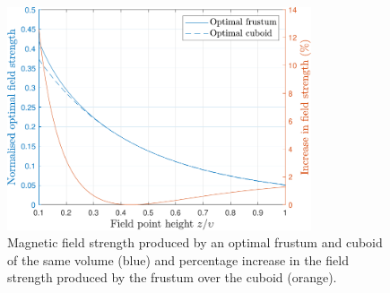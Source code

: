 \begin{figure}
	\centering
	\includegraphics[width=0.8\textwidth]{p3/p3FIG9}
	\caption{Magnetic field strength produced by an optimal frustum and cuboid of the same volume (blue) and percentage increase in the field strength produced by the frustum over the cuboid (orange).}
	\label{fig:p3PFIeps}
\end{figure}